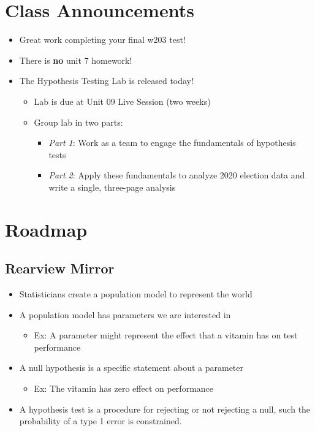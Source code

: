 \documentclass[
]{book}
\providecommand{\tightlist}{%
  \setlength{\itemsep}{0pt}\setlength{\parskip}{0pt}}
\theoremstyle{definition}
\theoremstyle{definition}
\theoremstyle{definition}
\theoremstyle{definition}
\theoremstyle{remark}
\begin{document}
\hypertarget{class-announcements-5}{%
\section{Class Announcements}\label{class-announcements-5}}

\begin{itemize}
\tightlist
\item
  Great work completing your final w203 test!
\item
  There is \textbf{no} unit 7 homework!
\item
  The Hypothesis Testing Lab is released today!

  \begin{itemize}
  \tightlist
  \item
    Lab is due at Unit 09 Live Session (two weeks)
  \item
    Group lab in two parts:

    \begin{itemize}
    \tightlist
    \item
      \emph{Part 1}: Work as a team to engage the fundamentals of hypothesis tests
    \item
      \emph{Part 2}: Apply these fundamentals to analyze 2020 election data and write a single, three-page analysis
    \end{itemize}
  \end{itemize}
\end{itemize}

\hypertarget{roadmap-3}{%
\section{Roadmap}\label{roadmap-3}}

\hypertarget{rearview-mirror-1}{%
\subsection{Rearview Mirror}\label{rearview-mirror-1}}

\begin{itemize}
\tightlist
\item
  Statisticians create a population model to represent the world
\item
  A population model has parameters we are interested in

  \begin{itemize}
  \tightlist
  \item
    Ex: A parameter might represent the effect that a vitamin has on test performance
  \end{itemize}
\item
  A null hypothesis is a specific statement about a parameter

  \begin{itemize}
  \tightlist
  \item
    Ex: The vitamin has zero effect on performance
  \end{itemize}
\item
  A hypothesis test is a procedure for rejecting or not rejecting a null, such the probability of a type 1 error is constrained.
\end{itemize}
\end{document}
